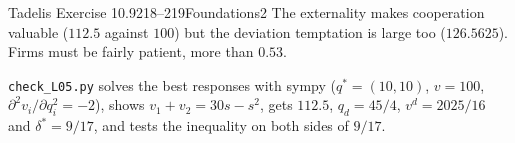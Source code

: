 \begin{exsol}{Tadelis Exercise 10.9}{218--219}{Foundations}{2}
\interp The externality makes cooperation valuable ($112.5$ against $100$) but the deviation
temptation is large too ($126.5625$). Firms must be fairly patient, more than $0.53$.

\verify \texttt{check\_L05.py} solves the best responses with sympy ($q^* = (10,10)$, $v = 100$,
$\partial^2 v_i/\partial q_i^2 = -2$), shows $v_1 + v_2 = 30s - s^2$, gets $112.5$, $q_d = 45/4$,
$v^d = 2025/16$ and $\delta^* = 9/17$, and tests the inequality on both sides of $9/17$.

\end{exsol}
